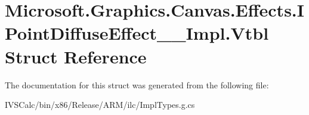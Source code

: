 \hypertarget{struct_microsoft_1_1_graphics_1_1_canvas_1_1_effects_1_1_i_point_diffuse_effect_____impl_1_1_vtbl}{}\section{Microsoft.\+Graphics.\+Canvas.\+Effects.\+I\+Point\+Diffuse\+Effect\+\_\+\+\_\+\+Impl.\+Vtbl Struct Reference}
\label{struct_microsoft_1_1_graphics_1_1_canvas_1_1_effects_1_1_i_point_diffuse_effect_____impl_1_1_vtbl}


The documentation for this struct was generated from the following file\+:\begin{DoxyCompactItemize}
\item 
I\+V\+S\+Calc/bin/x86/\+Release/\+A\+R\+M/ilc/Impl\+Types.\+g.\+cs\end{DoxyCompactItemize}
